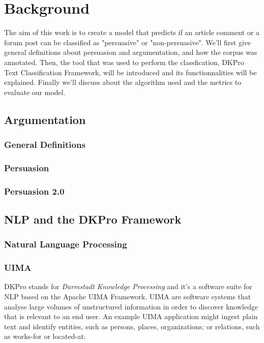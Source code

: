 \chapter{Background}  %
The aim of this work is to create a model that predicts if an article comment or a forum post can be classified as "persuasive" or "non-persuasive". We'll first give general definitions about persuasion and argumentation, and how the corpus was annotated. Then, the tool that was used to perform the classfication, DKPro Text Classification Framework, will be introduced and its functionnalities will be explained. Finally we'll discuss about the algorithm used and the metrics to evaluate our model.
\section{Argumentation}  %
\subsection{General Definitions}
\subsection{Persuasion}
\subsection{Persuasion 2.0} %

\section{NLP and the DKPro Framework}
\subsection{Natural Language Processing}
\subsection{UIMA}
DKPro stands for \emph{Darmstadt Knowledge Processing}
\cite{GurevychEtal2007dkpro0} and it's a software suite for NLP based on the Apache UIMA Framework. UIMA are software systems that analyse large volumes of unstructured information in order to discover knowledge that is relevant to an end user. An example UIMA application might ingest plain text and identify entities, such as persons, places, organizations; or relations, such as works-for or located-at:

